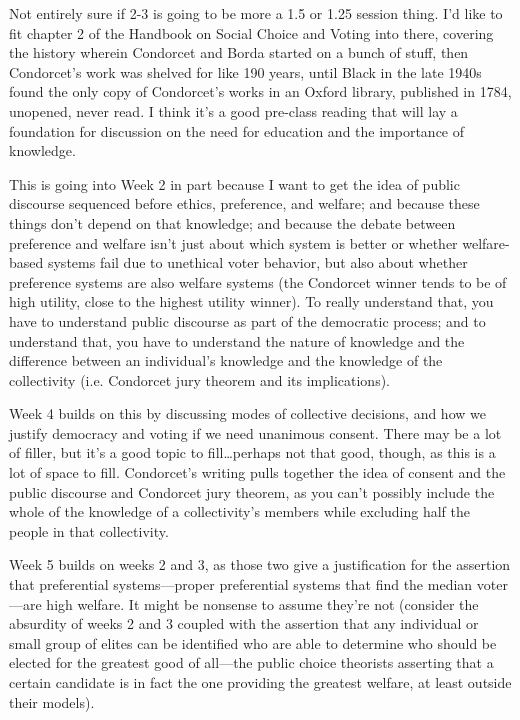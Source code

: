 
\newcommand{\technical}{\textbf{[Technical]}}
\newcommand{\philosophical}{\textbf{[Philosophical]}}



Not entirely sure if 2-3 is going to be more a 1.5 or 1.25 session thing.  I'd like to fit chapter 2 of the Handbook on Social Choice and Voting into there, covering the history wherein Condorcet and Borda started on a bunch of stuff, then Condorcet's work was shelved for like 190 years, until Black in the late 1940s found the only copy of Condorcet's works in an Oxford library, published in 1784, unopened, never read.  I think it's a good pre-class reading that will lay a foundation for discussion on the need for education and the importance of knowledge.

This is going into Week 2 in part because I want to get the idea of public discourse sequenced before ethics, preference, and welfare; and because these things don't depend on that knowledge; and because the debate between preference and welfare isn't just about which system is better or whether welfare-based systems fail due to unethical voter behavior, but also about whether preference systems are also welfare systems (the Condorcet winner tends to be of high utility, close to the highest utility winner).  To really understand that, you have to understand public discourse as part of the democratic process; and to understand that, you have to understand the nature of knowledge and the difference between an individual's knowledge and the knowledge of the collectivity (i.e. Condorcet jury theorem and its implications).

Week 4 builds on this by discussing modes of collective decisions, and how we justify democracy and voting if we need unanimous consent.  There may be a lot of filler, but it's a good topic to fill…perhaps not that good, though, as this is a lot of space to fill.  Condorcet's writing pulls together the idea of consent and the public discourse and Condorcet jury theorem, as you can't possibly include the whole of the knowledge of a collectivity's members while excluding half the people in that collectivity.

Week 5 builds on weeks 2 and 3, as those two give a justification for the assertion that preferential systems—proper preferential systems that find the median voter—are high welfare.  It might be nonsense to assume they're not (consider the absurdity of weeks 2 and 3 coupled with the assertion that any individual or small group of elites can be identified who are able to determine who should be elected for the greatest good of all—the public choice theorists asserting that a certain candidate is in fact the one providing the greatest welfare, at least outside their models).


